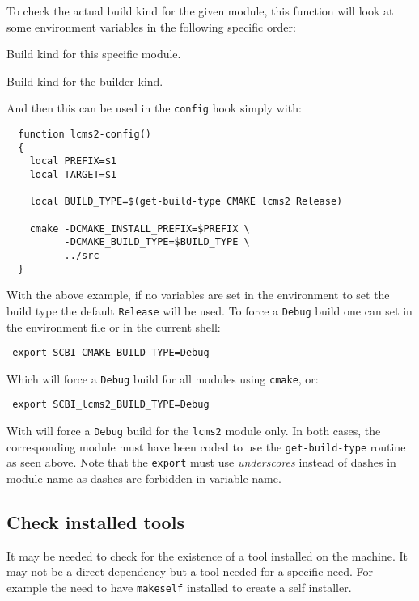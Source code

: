 \documentclass[a4paper,12pt,twoside]{article}
\newcommand{\code}[1]{\texttt{#1}}
\renewcommand{\emph}[1]{\textit{#1}}
\begin{document}
To check the actual build kind for the given module, this function will look at some environment variables in the following specific order:

\begin{description}[style=nextline]
	\item [SCBI\_<module>\_BUILD\_TYPE] Build kind for this specific module.
	\item [SCBI\_<CONFIG>\_BUILD\_TYPE] Build kind for the builder kind.
\end{description}

And then this can be used in the \code{config} hook simply with:

\begin{lstlisting}
  function lcms2-config()
  {
    local PREFIX=$1
    local TARGET=$1

    local BUILD_TYPE=$(get-build-type CMAKE lcms2 Release)

    cmake -DCMAKE_INSTALL_PREFIX=$PREFIX \
          -DCMAKE_BUILD_TYPE=$BUILD_TYPE \
          ../src
  }
\end{lstlisting}

With the above example, if no variables are set in the environment to set the build type the default \code{Release} will be used. To force a \code{Debug} build one can set in the environment file or in the current shell:

\begin{lstlisting}
 export SCBI_CMAKE_BUILD_TYPE=Debug
\end{lstlisting}

Which will force a \code{Debug} build for all modules using \code{cmake}, or:

\begin{lstlisting}
 export SCBI_lcms2_BUILD_TYPE=Debug
\end{lstlisting}

With will force a \code{Debug} build for the \code{lcms2} module only. In both cases, the corresponding module must have been coded to use the \code{get-build-type} routine as seen above. Note that the \code{export} must use \emph{underscores} instead of dashes in module name as dashes are forbidden in variable name.

\subsection{Check installed tools}

It may be needed to check for the existence of a tool installed on the machine. It may not be a direct dependency but a tool needed for a specific need. For example the need to have \code{makeself} installed to create a self installer.
\end{document}

